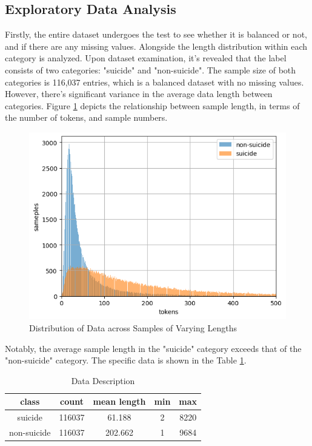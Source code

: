 \documentclass[ %
                    author={Louis Wang},
                supervisor={Dr. Qiang Liu},
                    degree={MSc},
                     title={Identification of Suicide Ideation in Texts},
                      type={},
                      year={2024}]{dissertation}
\begin{document}
\subsection{Exploratory Data Analysis}
\noindent
Firstly, the entire dataset undergoes the test to see whether it is balanced or not, and if there are any missing values. Alongside the length distribution within each category is analyzed. Upon dataset examination, it's revealed that the label consists of two categories: "suicide" and "non-suicide". The sample size of both categories is 116,037 entries, which is a balanced dataset with no missing values. However, there's significant variance in the average data length between categories. Figure \ref{fig:describe} depicts the relationship between sample length, in terms of the number of tokens, and sample numbers. 

\begin{figure}[h]
      \centering
      \includegraphics[width=0.6\linewidth]{../img/data_describe.png}
      \caption{Distribution of Data across Samples of Varying Lengths}
      \label{fig:describe}
\end{figure}

Notably, the average sample length in the "suicide" category exceeds that of the "non-suicide" category. The specific data is shown in the Table \ref{tab:describe}.

\begin{table}[h]
      \centering
      \begin{tabular}{ccccc}
            \hline
            class & count & mean length & min & max \\
            \hline
            suicide & 116037 & 61.188 & 2 & 8220 \\
            non-suicide & 116037 & 202.662 & 1 & 9684 \\
            \hline
      \end{tabular}
      \caption{Data Description}
      \label{tab:describe}
\end{table}
\end{document}
